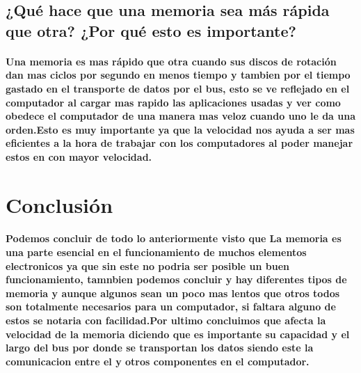 \documentclass{article}
\begin{document}
\subsection{¿Qué hace que una memoria sea más rápida que otra? ¿Por qué esto es importante?}

\paragraph{Una memoria es mas rápido que otra cuando sus discos de rotación dan mas ciclos por segundo en menos tiempo y tambien por el tiempo gastado en el transporte de datos por el bus, esto se ve reflejado en el computador al cargar mas rapido las aplicaciones usadas y ver como obedece el computador de una manera mas veloz cuando uno le da una orden.Esto es muy importante ya que la velocidad nos ayuda a ser mas eficientes a la hora de trabajar con los computadores al poder manejar estos en con mayor velocidad.}

\section{Conclusión} \label{conclulsion}
\paragraph{Podemos concluir de todo lo anteriormente visto que La memoria es una parte esencial en el funcionamiento de muchos elementos electronicos ya que sin este no podria ser posible un buen funcionamiento, tamnbien podemos concluir y hay diferentes tipos de memoria y aunque algunos sean un poco mas lentos que otros todos son totalmente necesarios  para un computador, si faltara alguno de estos se notaria con facilidad.Por ultimo concluimos que afecta la velocidad de la memoria diciendo que es importante su capacidad y el largo del bus por donde se transportan los datos siendo este la comunicacion entre el y otros componentes en el computador. }



\end{document}
